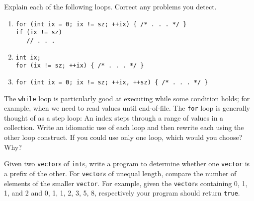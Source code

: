 %
%
\begin{question}
Explain each of the following loops. Correct any problems
you detect.
\begin{enumerate}[label=(\alph*)]
^^I\item
\begin{lstlisting}
for (int ix = 0; ix != sz; ++ix) { /* . . . */ }
if (ix != sz)
   // . . .
\end{lstlisting}

^^I\item
\begin{lstlisting}
int ix;
for (ix != sz; ++ix) { /* . . . */ }
\end{lstlisting}

^^I\item
\begin{lstlisting}
for (int ix = 0; ix != sz; ++ix, ++sz) { /* . . . */ }
\end{lstlisting}
\end{enumerate}
\end{question}

\begin{question}
The \verb|while| loop is particularly good at executing while some
condition holds; for example, when we need to read values until end-of-file.
The \verb|for| loop is generally thought of as a step loop: An index steps through
a range of values in a collection. Write an idiomatic use of each loop and
then rewrite each using the other loop construct. If you could use only one
loop, which would you choose? Why?
\end{question}

\begin{question}
Given two \verb|vector|s of \verb|int|s, write a program to determine
whether one \verb|vector| is a prefix of the other. For \verb|vector|s of unequal
length, compare the number of elements of the smaller \verb|vector|. For
example, given the \verb|vector|s containing 0, 1, 1, and 2 and 0, 1, 1, 2, 3, 5,
8, respectively your program should return \verb|true|.
\end{question}
